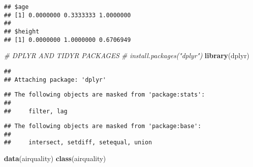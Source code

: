\documentclass[
]{article}
\newenvironment{Shaded}{\begin{snugshade}}{\end{snugshade}}
\newcommand{\CommentTok}[1]{\textcolor[rgb]{0.56,0.35,0.01}{\textit{#1}}}
\newcommand{\DecValTok}[1]{\textcolor[rgb]{0.00,0.00,0.81}{#1}}
\newcommand{\DocumentationTok}[1]{\textcolor[rgb]{0.56,0.35,0.01}{\textbf{\textit{#1}}}}
\newcommand{\FunctionTok}[1]{\textcolor[rgb]{0.13,0.29,0.53}{\textbf{#1}}}
\newcommand{\NormalTok}[1]{#1}
\newcommand{\OtherTok}[1]{\textcolor[rgb]{0.56,0.35,0.01}{#1}}
\newcommand{\SpecialCharTok}[1]{\textcolor[rgb]{0.81,0.36,0.00}{\textbf{#1}}}
\begin{document}
\begin{Shaded}
\end{Shaded}

\begin{verbatim}
## $age
## [1] 0.0000000 0.3333333 1.0000000
## 
## $height
## [1] 0.0000000 1.0000000 0.6706949
\end{verbatim}

\begin{Shaded}
\begin{Highlighting}[]
\CommentTok{\# DPLYR AND TIDYR PACKAGES}
\CommentTok{\# install.packages("dplyr")}
\FunctionTok{library}\NormalTok{(dplyr)}
\end{Highlighting}
\end{Shaded}

\begin{verbatim}
## 
## Attaching package: 'dplyr'
\end{verbatim}

\begin{verbatim}
## The following objects are masked from 'package:stats':
## 
##     filter, lag
\end{verbatim}

\begin{verbatim}
## The following objects are masked from 'package:base':
## 
##     intersect, setdiff, setequal, union
\end{verbatim}

\begin{Shaded}
\begin{Highlighting}[]
\FunctionTok{data}\NormalTok{(airquality)}
\FunctionTok{class}\NormalTok{(airquality)}
\end{Highlighting}
\end{Shaded}
\end{document}
